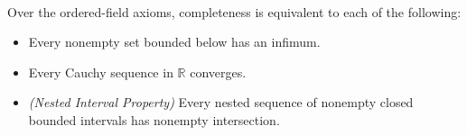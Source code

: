 








\begin{remark*}~\\
Over the ordered-field axioms, completeness is equivalent to each of the
following:
\begin{itemize}
  \item Every nonempty set bounded below has an infimum.
  \item Every Cauchy sequence in $\mathbb{R}$ converges.
  \item \emph{(Nested Interval Property)} Every nested sequence of nonempty
        closed bounded intervals has nonempty intersection.
\end{itemize}
\end{remark*}